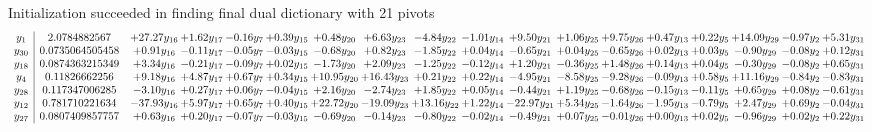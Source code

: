 \documentclass[9pt]{article}
\begin{document}
Initialization succeeded in finding final dual dictionary with 21 pivots
\[\begin{array}{c| c c@{\hskip 2pt} c@{\hskip 2pt} c@{\hskip 2pt} c@{\hskip 2pt} c@{\hskip 2pt} c@{\hskip 2pt} c@{\hskip 2pt} c@{\hskip 2pt} c@{\hskip 2pt} c@{\hskip 2pt} c@{\hskip 2pt} c@{\hskip 2pt} c@{\hskip 2pt} c@{\hskip 2pt} c@{\hskip 2pt} c@{\hskip 2pt} }
 y_{1}   &  2.0784882567 & + 27.27 y_{16} & +  1.62 y_{17} & -0.16 y_{7} & +  0.39 y_{15} & +  0.48 y_{20} & +  6.63 y_{23} & -4.84 y_{22} & -1.01 y_{14} & +  9.50 y_{21} & +  1.06 y_{25} & +  9.75 y_{26} & +  0.47 y_{13} & +  0.22 y_{5} & + 14.09 y_{29} & -0.97 y_{2} & +  5.31 y_{31}\\
 y_{30}   &  0.0735064505458 & +  0.91 y_{16} & -0.11 y_{17} & -0.05 y_{7} & -0.03 y_{15} & -0.68 y_{20} & +  0.82 y_{23} & -1.85 y_{22} & +  0.04 y_{14} & -0.65 y_{21} & +  0.04 y_{25} & -0.65 y_{26} & +  0.02 y_{13} & +  0.03 y_{5} & -0.90 y_{29} & -0.08 y_{2} & +  0.12 y_{31}\\
 y_{18}   &  0.0874363215349 & +  3.34 y_{16} & -0.21 y_{17} & -0.09 y_{7} & +  0.02 y_{15} & -1.73 y_{20} & +  2.09 y_{23} & -1.25 y_{22} & -0.12 y_{14} & +  1.20 y_{21} & -0.36 y_{25} & +  1.48 y_{26} & +  0.14 y_{13} & +  0.04 y_{5} & -0.30 y_{29} & -0.08 y_{2} & +  0.65 y_{31}\\
 y_{4}   &  0.11826662256 & +  9.18 y_{16} & +  4.87 y_{17} & +  0.67 y_{7} & +  0.34 y_{15} & + 10.95 y_{20} & + 16.43 y_{23} & +  0.21 y_{22} & +  0.22 y_{14} & -4.95 y_{21} & -8.58 y_{25} & -9.28 y_{26} & -0.09 y_{13} & +  0.58 y_{5} & + 11.16 y_{29} & -0.84 y_{2} & -0.83 y_{31}\\
 y_{28}   &  0.117347006285 & -3.10 y_{16} & +  0.27 y_{17} & +  0.06 y_{7} & -0.04 y_{15} & +  2.16 y_{20} & -2.74 y_{23} & +  1.85 y_{22} & +  0.05 y_{14} & -0.44 y_{21} & +  1.19 y_{25} & -0.68 y_{26} & -0.15 y_{13} & -0.11 y_{5} & +  0.65 y_{29} & +  0.08 y_{2} & -0.61 y_{31}\\
 y_{12}   &  0.781710221634 & -37.93 y_{16} & +  5.97 y_{17} & +  0.65 y_{7} & +  0.40 y_{15} & + 22.72 y_{20} & -19.09 y_{23} & + 13.16 y_{22} & +  1.22 y_{14} & -22.97 y_{21} & +  5.34 y_{25} & -1.64 y_{26} & -1.95 y_{13} & -0.79 y_{5} & +  2.47 y_{29} & +  0.69 y_{2} & -0.04 y_{31}\\
 y_{27}   &  0.0807409857757 & +  0.63 y_{16} & +  0.20 y_{17} & -0.07 y_{7} & -0.03 y_{15} & -0.69 y_{20} & -0.14 y_{23} & -0.80 y_{22} & -0.02 y_{14} & -0.49 y_{21} & +  0.07 y_{25} & -0.01 y_{26} & +  0.00 y_{13} & +  0.02 y_{5} & -0.96 y_{29} & +  0.02 y_{2} & +  0.22 y_{31}\\

\end{array}\]
\end{document}
